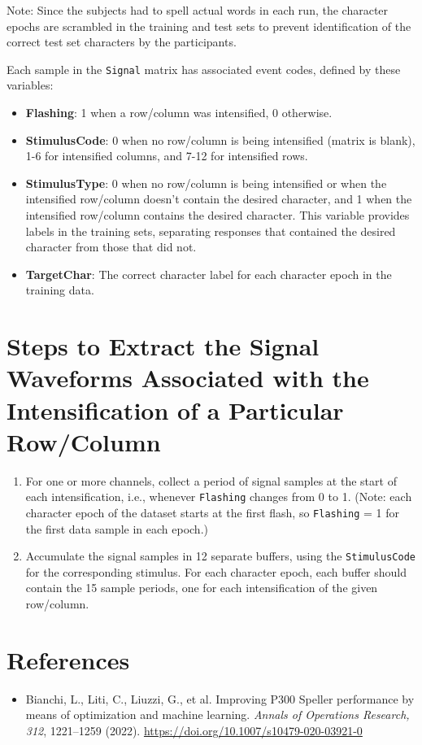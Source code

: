 \documentclass{article}
\begin{document}
Note: Since the subjects had to spell actual words in each run, the character epochs are scrambled in the training and test sets to prevent identification of the correct test set characters by the participants.

Each sample in the \texttt{Signal} matrix has associated event codes, defined by these variables:
\begin{itemize}
    \item \textbf{Flashing}: 1 when a row/column was intensified, 0 otherwise.
    \item \textbf{StimulusCode}: 0 when no row/column is being intensified (matrix is blank), 1-6 for intensified columns, and 7-12 for intensified rows.
    \item \textbf{StimulusType}: 0 when no row/column is being intensified or when the intensified row/column doesn't contain the desired character, and 1 when the intensified row/column contains the desired character. This variable provides labels in the training sets, separating responses that contained the desired character from those that did not.
    \item \textbf{TargetChar}: The correct character label for each character epoch in the training data.
\end{itemize}

\section{Steps to Extract the Signal Waveforms Associated with the Intensification of a Particular Row/Column}
\begin{enumerate}
    \item For one or more channels, collect a period of signal samples at the start of each intensification, i.e., whenever \texttt{Flashing} changes from 0 to 1. (Note: each character epoch of the dataset starts at the first flash, so \texttt{Flashing} = 1 for the first data sample in each epoch.)
    \item Accumulate the signal samples in 12 separate buffers, using the \texttt{StimulusCode} for the corresponding stimulus. For each character epoch, each buffer should contain the 15 sample periods, one for each intensification of the given row/column.
\end{enumerate}

\section{References}
\begin{itemize}
    \item Bianchi, L., Liti, C., Liuzzi, G., et al. Improving P300 Speller performance by means of optimization and machine learning. \emph{Annals of Operations Research, 312}, 1221–1259 (2022). \url{https://doi.org/10.1007/s10479-020-03921-0}
\end{itemize}
\end{document}
